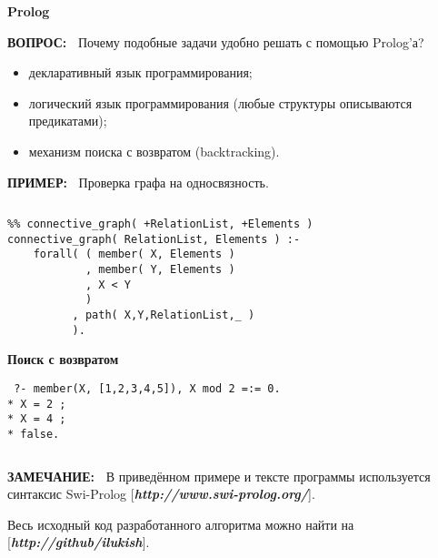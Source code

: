 \documentclass{beamer}
\newcommand{\green}{\color[rgb]{0,0.4,0}}
\newcommand{\blue}{\color{blue}}
\newcommand{\examp}{%
     {\bf \green ПРИМЕР:\ }}
\newcommand{\remark}{%
     {\bf \green ЗАМЕЧАНИЕ:\ }}
\newcommand{\question}{%
     {\bf \green ВОПРОС:\ }}
\newcommand{\retline}{
	
$ $

}
\begin{document}
\begin{frame} 
{\bf {\blue} Prolog }

{\question} Почему подобные задачи удобно решать с помощью Prolog'а?

\begin{itemize}
\item
декларативный язык программирования;
\item
логический язык программирования (любые структуры описываются предикатами);
\item
механизм поиска с возвратом (backtracking).
\end{itemize}

\end{frame}

\begin{frame}[fragile]

{\examp}
Проверка графа на односвязность.
{\retline}

\begin{lstlisting}
%% connective_graph( +RelationList, +Elements )
connective_graph( RelationList, Elements ) :-
    forall( ( member( X, Elements )
            , member( Y, Elements )
            , X < Y
            )
          , path( X,Y,RelationList,_ )
          ).
\end{lstlisting}

\end{frame}

\begin{frame}[fragile]
{\bf {\blue} Поиск с возвратом }

{\tt
?- member(X, [1,2,3,4,5]), X mod 2 =:= 0. \\*
\pause
X = 2 ; \\*
\pause
X = 4 ; \\*
\pause
false.
}

\pause
{\retline}

{\remark} В приведённом примере и тексте программы используется синтаксис Swi-Prolog
[\textit{{\bf {\blue http://www.swi-prolog.org/}}}].

Весь исходный код разработанного алгоритма можно найти на
[\textit{{\bf {\blue http://github/ilukish}}}].

\end{frame}
\end{document}
